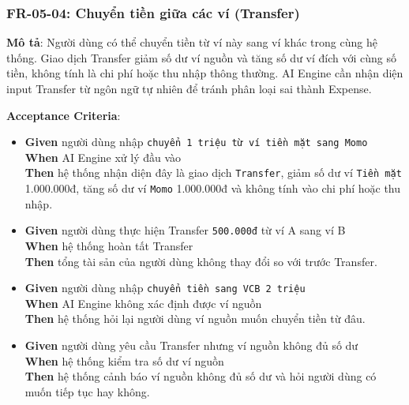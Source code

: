 \subsubsection{FR-05-04: Chuyển tiền giữa các ví (Transfer)}

\textbf{Mô tả}: Người dùng có thể chuyển tiền từ ví này sang ví khác trong cùng hệ thống. Giao dịch Transfer giảm số dư ví nguồn và tăng số dư ví đích với cùng số tiền, không tính là chi phí hoặc thu nhập thông thường. AI Engine cần nhận diện input Transfer từ ngôn ngữ tự nhiên để tránh phân loại sai thành Expense.



\textbf{Acceptance Criteria}:

\begin{itemize}
\item \textbf{Given} người dùng nhập \texttt{chuyển 1 triệu từ ví tiền mặt sang Momo}  \\ \hspace*{1.5em}  \textbf{When} AI Engine xử lý đầu vào  \\ \hspace*{1.5em}  \textbf{Then} hệ thống nhận diện đây là giao dịch \texttt{Transfer}, giảm số dư ví \texttt{Tiền mặt} 1.000.000đ, tăng số dư ví \texttt{Momo} 1.000.000đ và không tính vào chi phí hoặc thu nhập.
\item \textbf{Given} người dùng thực hiện Transfer \texttt{500.000đ} từ ví A sang ví B  \\ \hspace*{1.5em}  \textbf{When} hệ thống hoàn tất Transfer  \\ \hspace*{1.5em}  \textbf{Then} tổng tài sản của người dùng không thay đổi so với trước Transfer.
\item \textbf{Given} người dùng nhập \texttt{chuyển tiền sang VCB 2 triệu}  \\ \hspace*{1.5em}  \textbf{When} AI Engine không xác định được ví nguồn  \\ \hspace*{1.5em}  \textbf{Then} hệ thống hỏi lại người dùng ví nguồn muốn chuyển tiền từ đâu.
\item \textbf{Given} người dùng yêu cầu Transfer nhưng ví nguồn không đủ số dư  \\ \hspace*{1.5em}  \textbf{When} hệ thống kiểm tra số dư ví nguồn  \\ \hspace*{1.5em}  \textbf{Then} hệ thống cảnh báo ví nguồn không đủ số dư và hỏi người dùng có muốn tiếp tục hay không.

\end{itemize}
